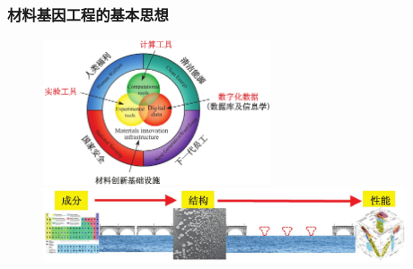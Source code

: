 \small
%
\frame
{
	\frametitle{材料基因工程的基本思想}
\begin{figure}[h!]
\centering
\vspace*{-0.2in}
\includegraphics[width=0.6\textwidth]{Figures/Mat_Geno_Ene-1.png}
\vskip 0.10in
\includegraphics[height=0.85in]{Figures/Mat_Geno_Ene-3.png}
\label{Mater_Genome}
\end{figure}
}

